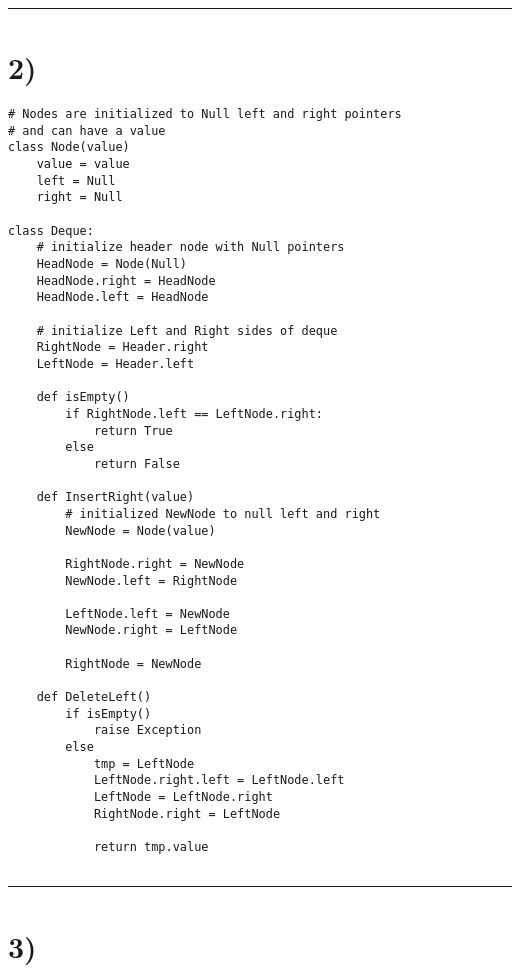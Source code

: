 \documentclass[a4paper,11pt]{article}
\begin{document}
\noindent\rule{\linewidth}{1.0pt}

\section*{2)}
\begin{verbatim}
# Nodes are initialized to Null left and right pointers
# and can have a value
class Node(value)
    value = value
    left = Null
    right = Null

class Deque:
    # initialize header node with Null pointers
    HeadNode = Node(Null)
    HeadNode.right = HeadNode
    HeadNode.left = HeadNode
    
    # initialize Left and Right sides of deque
    RightNode = Header.right
    LeftNode = Header.left

    def isEmpty()
        if RightNode.left == LeftNode.right:
            return True
        else
            return False

    def InsertRight(value)
        # initialized NewNode to null left and right
        NewNode = Node(value)
       
        RightNode.right = NewNode
        NewNode.left = RightNode
    
        LeftNode.left = NewNode
        NewNode.right = LeftNode
        
        RightNode = NewNode
	     
    def DeleteLeft()
        if isEmpty()
            raise Exception
        else
            tmp = LeftNode
            LeftNode.right.left = LeftNode.left
            LeftNode = LeftNode.right
            RightNode.right = LeftNode
            
            return tmp.value
            
\end{verbatim}

\noindent\rule{\linewidth}{1.0pt}

\section*{3)} 
\end{document}

